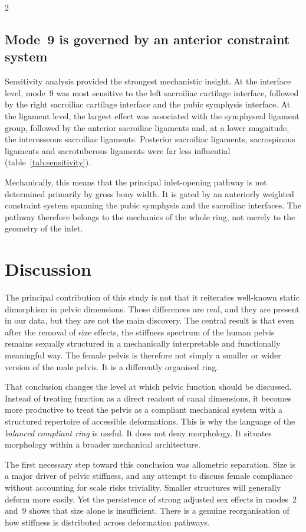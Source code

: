 \documentclass[openacc]{rsproca_new}
\begin{document}
\begin{multicols}{2}
\subsection{Mode~9 is governed by an anterior constraint system}

Sensitivity analysis provided the strongest mechanistic insight. At the interface level, mode~9 was most sensitive to the left sacroiliac cartilage interface, followed by the right sacroiliac cartilage interface and the pubic symphysis interface. At the ligament level, the largest effect was associated with the symphyseal ligament group, followed by the anterior sacroiliac ligaments and, at a lower magnitude, the interosseous sacroiliac ligaments. Posterior sacroiliac ligaments, sacrospinous ligaments and sacrotuberous ligaments were far less influential (table~\ref{tab:sensitivity}).

Mechanically, this means that the principal inlet-opening pathway is not determined primarily by gross bony width. It is gated by an anteriorly weighted constraint system spanning the pubic symphysis and the sacroiliac interfaces. The pathway therefore belongs to the mechanics of the whole ring, not merely to the geometry of the inlet.

\section{Discussion}

The principal contribution of this study is not that it reiterates well-known static dimorphism in pelvic dimensions. Those differences are real, and they are present in our data, but they are not the main discovery. The central result is that even after the removal of size effects, the stiffness spectrum of the human pelvis remains sexually structured in a mechanically interpretable and functionally meaningful way. The female pelvis is therefore not simply a smaller or wider version of the male pelvis. It is a differently organised ring.

That conclusion changes the level at which pelvic function should be discussed. Instead of treating function as a direct readout of canal dimensions, it becomes more productive to treat the pelvis as a compliant mechanical system with a structured repertoire of accessible deformations. This is why the language of the \emph{balanced compliant ring} is useful. It does not deny morphology. It situates morphology within a broader mechanical architecture.

The first necessary step toward this conclusion was allometric separation. Size is a major driver of pelvic stiffness, and any attempt to discuss female compliance without accounting for scale risks triviality. Smaller structures will generally deform more easily. Yet the persistence of strong adjusted sex effects in modes~2 and~9 shows that size alone is insufficient. There is a genuine reorganisation of how stiffness is distributed across deformation pathways.


\end{multicols}
\end{document}
